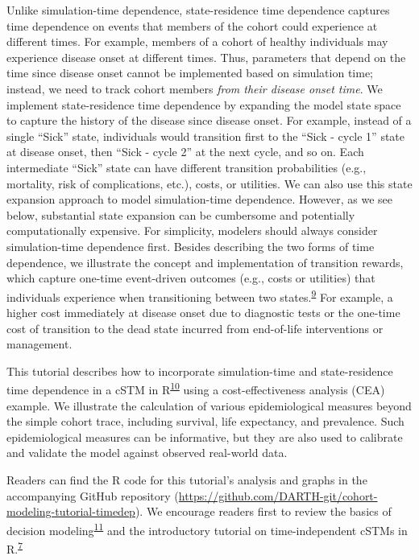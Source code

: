 \documentclass[
]{article}
\begin{document}
Unlike simulation-time dependence, state-residence time dependence captures time dependence on events that members of the cohort could experience at different times. For example, members of a cohort of healthy individuals may experience disease onset at different times. Thus, parameters that depend on the time since disease onset cannot be implemented based on simulation time; instead, we need to track cohort members \emph{from their disease onset time}. We implement state-residence time dependence by expanding the model state space to capture the history of the disease since disease onset. For example, instead of a single ``Sick'' state, individuals would transition first to the ``Sick - cycle 1'' state at disease onset, then ``Sick - cycle 2'' at the next cycle, and so on. Each intermediate ``Sick'' state can have different transition probabilities (e.g., mortality, risk of complications, etc.), costs, or utilities. We can also use this state expansion approach to model simulation-time dependence. However, as we see below, substantial state expansion can be cumbersome and potentially computationally expensive. For simplicity, modelers should always consider simulation-time dependence first. Besides describing the two forms of time dependence, we illustrate the concept and implementation of transition rewards, which capture one-time event-driven outcomes (e.g., costs or utilities) that individuals experience when transitioning between two states.\textsuperscript{\protect\hyperlink{ref-Krijkamp2019}{9}} For example, a higher cost immediately at disease onset due to diagnostic tests or the one-time cost of transition to the dead state incurred from end-of-life interventions or management.

This tutorial describes how to incorporate simulation-time and state-residence time dependence in a cSTM in R\textsuperscript{\protect\hyperlink{ref-Jalal2017b}{10}} using a cost-effectiveness analysis (CEA) example. We illustrate the calculation of various epidemiological measures beyond the simple cohort trace, including survival, life expectancy, and prevalence. Such epidemiological measures can be informative, but they are also used to calibrate and validate the model against observed real-world data.

Readers can find the R code for this tutorial's analysis and graphs in the accompanying GitHub repository (\url{https://github.com/DARTH-git/cohort-modeling-tutorial-timedep}). We encourage readers first to review the basics of decision modeling\textsuperscript{\protect\hyperlink{ref-Hunink2014}{11}} and the introductory tutorial on time-independent cSTMs in R.\textsuperscript{\protect\hyperlink{ref-Alarid-Escudero2022b}{7}}
\end{document}
